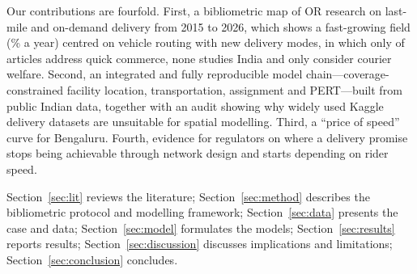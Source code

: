 Our contributions are fourfold. First, a bibliometric map of OR research on last-mile and on-demand delivery from 2015 to 2026, which shows a fast-growing field (\BibGrowthPct\% a year) centred on vehicle routing with new delivery modes, in which only \BibQComm{} of \BibIncluded{} articles address quick commerce, none studies India and only \BibWelfare{} consider courier welfare. Second, an integrated and fully reproducible model chain---coverage-constrained facility location, transportation, assignment and PERT---built from public Indian data, together with an audit showing why widely used Kaggle delivery datasets are unsuitable for spatial modelling. Third, a ``price of speed'' curve for Bengaluru. Fourth, evidence for regulators on where a delivery promise stops being achievable through network design and starts depending on rider speed.

Section~\ref{sec:lit} reviews the literature; Section~\ref{sec:method} describes the bibliometric protocol and modelling framework; Section~\ref{sec:data} presents the case and data; Section~\ref{sec:model} formulates the models; Section~\ref{sec:results} reports results; Section~\ref{sec:discussion} discusses implications and limitations; Section~\ref{sec:conclusion} concludes.
